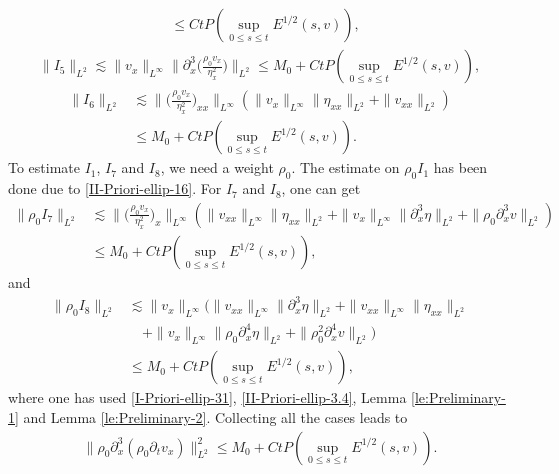 \documentclass[11pt, reqno]{amsart}
\numberwithin{equation}{section}
\begin{document}
{\begin{equation*}
\begin{aligned}
&\leq Ct P(\sup_{0\leq s\leq t}E^{1/2}(s,v)),
\end{aligned}
\end{equation*}
\begin{equation*}
\begin{aligned}
\|I_5\|_{L^2}
\lesssim
\|v_{x}\|_{L^\infty}\bigg\|\partial_x^3\bigg(\frac{\rho_0v_x}{\eta_x^2}\bigg)\bigg\|_{L^2}
\leq M_0+Ct P(\sup_{0\leq s\leq t}E^{1/2}(s,v)),
\end{aligned}
\end{equation*}
\begin{equation*}
\begin{aligned}
\|I_6\|_{L^2}&\lesssim
\bigg\|\bigg(\frac{\rho_0v_x}{\eta_x^2}\bigg)_{xx}\bigg\|_{L^\infty}(\|v_{x}\|_{L^\infty}\|\eta_{xx}\|_{L^2}
+\|v_{xx}\|_{L^2})\\
&\leq M_0+Ct P(\sup_{0\leq s\leq t}E^{1/2}(s,v)).
\end{aligned}
\end{equation*}
To estimate \(I_1\), \(I_7\) and \(I_8\), we need a weight \(\rho_0\). The estimate on \(\rho_0I_1\) has been done due to \eqref{II-Priori-ellip-16}.
For \(I_7\) and \(I_8\), one can get
{\small \begin{equation*}
\begin{aligned}
\|\rho_0I_7\|_{L^2}
&\lesssim
\bigg\|\bigg(\frac{\rho_0v_x}{\eta_x^2}\bigg)_x\bigg\|_{L^\infty}(\|v_{xx}\|_{L^\infty}\|\eta_{xx}\|_{L^2}
+\|v_{x}\|_{L^\infty}\|\partial_x^3\eta\|_{L^2}+\|\rho_0\partial_x^3v\|_{L^2})\\
&\leq M_0+Ct P(\sup_{0\leq s\leq t}E^{1/2}(s,v)),
\end{aligned}
\end{equation*}}
and
\begin{equation*}
\begin{aligned}
\|\rho_0I_8\|_{L^2}
&\lesssim
\|v_x\|_{L^\infty}(\|v_{xx}\|_{L^\infty}\|\partial_x^3\eta\|_{L^2}
+\|v_{xx}\|_{L^\infty}\|\eta_{xx}\|_{L^2}\\
&\quad+\|v_{x}\|_{L^\infty}\|\rho_0\partial_x^4\eta\|_{L^2}+\|\rho_0^2\partial_x^4v\|_{L^2})\\
&\leq M_0+Ct P(\sup_{0\leq s\leq t}E^{1/2}(s,v)),
\end{aligned}
\end{equation*}
where one has used \eqref{I-Priori-ellip-31}, \eqref{II-Priori-ellip-3.4}, Lemma \ref{le:Preliminary-1} and Lemma \ref{le:Preliminary-2}.
Collecting all the cases leads to
\begin{equation}\label{II-Priori-ellip-17}
\begin{aligned}
\|\rho_0\partial_x^3(\rho_0\partial_tv_x)\|_{L^2}^2
\leq M_0+Ct P(\sup_{0\leq s\leq t}E^{1/2}(s,v)).
\end{aligned}
\end{equation}

}
\end{document}
